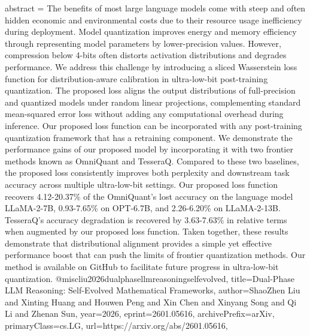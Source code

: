 {      abstract = {The benefits of most large language models come with steep and often hidden economic and environmental costs due to their resource usage inefficiency during deployment. Model quantization improves energy and memory efficiency through representing model parameters by lower-precision values. However, compression below 4-bits often distorts activation distributions and degrades performance. We address this challenge by introducing a sliced Wasserstein loss function for distribution-aware calibration in ultra-low-bit post-training quantization. The proposed loss aligns the output distributions of full-precision and quantized models under random linear projections, complementing standard mean-squared error loss without adding any computational overhead during inference. Our proposed loss function can be incorporated with any post-training quantization framework that has a retraining component. We demonstrate the performance gains of our proposed model by incorporating it with two frontier methods known as OmniQuant and TesseraQ. Compared to these two baselines, the proposed loss consistently improves both perplexity and downstream task accuracy across multiple ultra-low-bit settings. Our proposed loss function recovers 4.12-20.37\% of the OmniQuant's lost accuracy on the language model LLaMA-2-7B, 0.93-7.65\% on OPT-6.7B, and 2.26-6.20\% on LLaMA-2-13B. TesseraQ's accuracy degradation is recovered by 3.63-7.63\% in relative terms when augmented by our proposed loss function. Taken together, these results demonstrate that distributional alignment provides a simple yet effective performance boost that can push the limits of frontier quantization methods. Our method is available on GitHub to facilitate future progress in ultra-low-bit quantization.}
}@misc{liu2026dualphasellmreasoningselfevolved,
      title={Dual-Phase LLM Reasoning: Self-Evolved Mathematical Frameworks}, 
      author={ShaoZhen Liu and Xinting Huang and Houwen Peng and Xin Chen and Xinyang Song and Qi Li and Zhenan Sun},
      year={2026},
      eprint={2601.05616},
      archivePrefix={arXiv},
      primaryClass={cs.LG},
      url={https://arxiv.org/abs/2601.05616},
}

